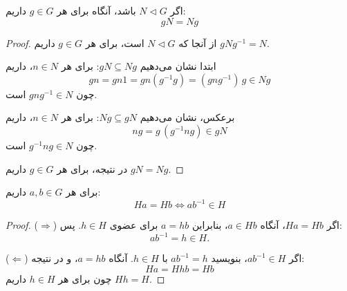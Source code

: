 \begin{frame}
    \begin{lemma}
        اگر $N \triangleleft G$ باشد، آنگاه برای هر $g \in G$ داریم:
        \[
            gN = Ng
        \]
    \end{lemma}


    \begin{proof}
        از آنجا که \(N \triangleleft G\) است، برای هر \(g \in G\) داریم \(gNg^{-1} = N\).

        ابتدا نشان می‌دهیم \(gN \subseteq Ng\): برای هر \(n \in N\)، داریم
        \[
            gn = gn1 = gn(g^{-1}g) =(gng^{-1})\,g \in Ng
        \]
        چون \(gng^{-1} \in N\) است.

        برعکس، نشان می‌دهیم \(Ng \subseteq gN\): برای هر \(n \in N\)، داریم
        \[
            ng = g\,(g^{-1}ng) \in gN
        \]
        چون \(g^{-1}ng \in N\) است.

        در نتیجه، برای هر \(g \in G\) داریم \(gN = Ng\).
    \end{proof}
\end{frame}

\begin{frame}
    \begin{remark}
        برای هر $a,b \in G$ داریم:
        \[
            Ha = Hb \iff ab^{-1} \in H
        \]
    \end{remark}

    \begin{proof}
        (\(\Rightarrow\)) اگر \(Ha = Hb\)، آنگاه \(a \in Hb\)، بنابراین \(a = hb\) برای عضوی \(h \in H\). پس:
        \[
            ab^{-1} = h \in H.
        \]

        (\(\Leftarrow\)) اگر \(ab^{-1} \in H\)، بنویسید \(ab^{-1} = h\) با \(h \in H\). آنگاه \(a = hb\)، و در نتیجه:
        \[
            Ha = Hhb = Hb
        \]
        چون برای هر \(h \in H\) داریم \(Hh = H\).
    \end{proof}

\end{frame}


